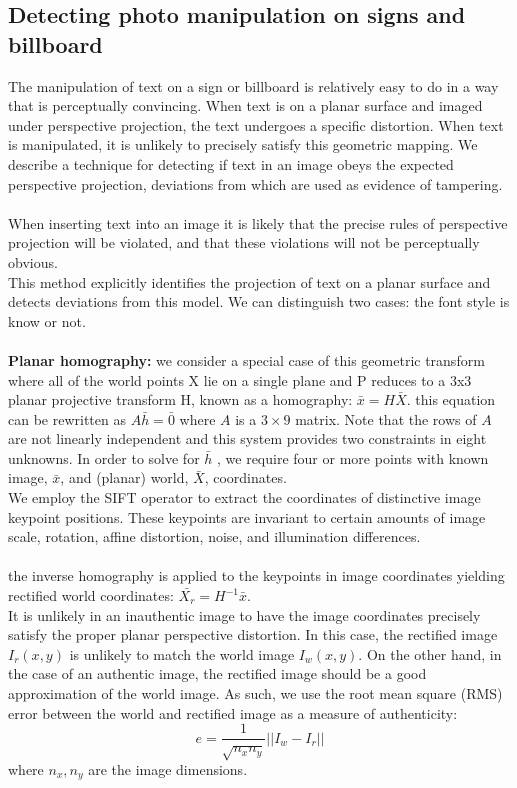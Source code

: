 \documentclass[10pt,a4paper]{book}
\begin{document}
\subsection{Detecting photo manipulation on signs and billboard}
The manipulation of text on a sign or billboard is relatively easy to do in a way that is perceptually convincing. When
text is on a planar surface and imaged under perspective projection, the text undergoes a specific distortion. When text is
manipulated, it is unlikely to precisely satisfy this geometric mapping. We describe a technique for detecting if text in an
image obeys the expected perspective projection, deviations from which are used as evidence of tampering.\\\\
When inserting text into an image it is likely that the precise rules of perspective projection will be violated, and that these violations will not be perceptually obvious.\\
This method explicitly identifies the projection of text on a planar surface and detects deviations from this model.
We can distinguish two cases: the font style is know or not.\\\\
\textbf{Planar homography:} we consider a special case of this geometric transform where all of the world points X lie on a single plane and P reduces to a 3x3 planar projective transform H, known as a homography: $\bar x = H \bar X$.
this equation can be rewritten as $A \bar h = \bar 0$ where $A$ is a $3 \times 9$ matrix. Note that the rows of $A$ are not linearly independent and this system provides two constraints in eight unknowns. 
In order to solve for $\bar h$ , we require four or more points with known image, $\bar x$, and (planar) world, $\bar X$, coordinates.\\
We employ the SIFT operator to extract the coordinates of distinctive image keypoint positions. These keypoints are
invariant to certain amounts of image scale, rotation, affine distortion, noise, and illumination differences.\\\\
the inverse homography is applied to the keypoints in image coordinates yielding rectified world coordinates: $\bar{X_r} = H^{-1} \bar x$.\\
It is unlikely in an inauthentic image to have the image coordinates precisely satisfy the proper planar perspective distortion. In this case, the rectified image $I_r(x,y)$ is unlikely to match the world image $I_w(x,y)$.
On the other hand, in the case of an authentic image, the rectified image should be a good approximation of the world image. As such, we use the root mean square (RMS) error between the world and rectified image as a measure of authenticity:
$$ e = \frac{1}{\sqrt{n_x n_y}} || I_w - I_r ||$$
where $n_x,n_y$ are the image dimensions.
\end{document}
